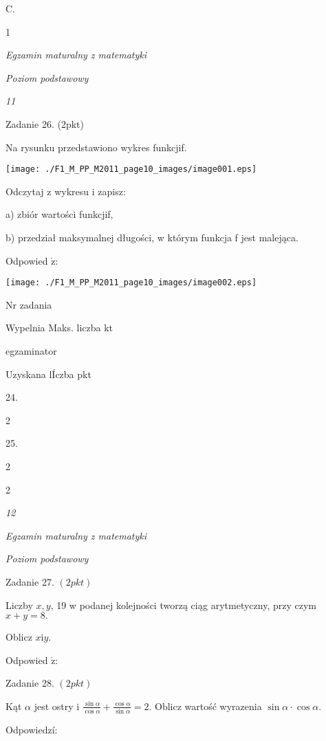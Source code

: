 \documentclass[a4paper,12pt]{article}
\begin{document}
C.

1





{\it Egzamin maturalny z matematyki}

{\it Poziom podstawowy}

{\it 11}

Zadanie 26. (2pkt)

Na rysunku przedstawiono wykres funkcjif.
\begin{center}
\texttt{[image: ./F1\_M\_PP\_M2011\_page10\_images/image001.eps]}
\end{center}
Odczytaj z wykresu i zapisz:

a) zbiór wartości funkcjif,

b) przedział maksymalnej długości, w którym funkcja f jest malejąca.

Odpowied $\acute{\mathrm{z}}$:
\begin{center}
\texttt{[image: ./F1\_M\_PP\_M2011\_page10\_images/image002.eps]}
\end{center}
Nr zadania

Wypelnia Maks. liczba kt

egzaminator

Uzyskana lÍczba pkt

24.

2

25.

2

2





{\it 12}

{\it Egzamin maturalny z matematyki}

{\it Poziom podstawowy}

Zadanie 27. $(2pkt)$

Liczby $x, y$, 19 w podanej kolejności tworzą ciąg arytmetyczny, przy czym $x+y=8.$

Oblicz $x\mathrm{i}y.$

Odpowied $\acute{\mathrm{z}}$:

Zadanie 28. $(2pkt)$

Kąt $\alpha$ jest ostry i $\displaystyle \frac{\sin\alpha}{\cos\alpha}+\frac{\cos\alpha}{\sin\alpha}=2$. Oblicz wartość wyrazenia $\sin\alpha\cdot\cos\alpha.$

Odpowiedzí:
\end{document}
